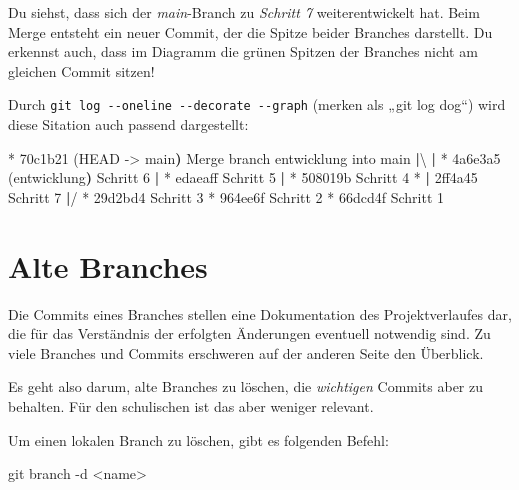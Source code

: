 \documentclass[
  letterpaper,
  DIV=11]{scrreprt}
\newenvironment{Shaded}{\begin{snugshade}}{\end{snugshade}}
\newcommand{\AttributeTok}[1]{\textcolor[rgb]{0.40,0.45,0.13}{#1}}
\newcommand{\ErrorTok}[1]{\textcolor[rgb]{0.68,0.00,0.00}{#1}}
\newcommand{\ExtensionTok}[1]{\textcolor[rgb]{0.00,0.23,0.31}{#1}}
\newcommand{\FunctionTok}[1]{\textcolor[rgb]{0.28,0.35,0.67}{#1}}
\newcommand{\KeywordTok}[1]{\textcolor[rgb]{0.00,0.23,0.31}{\textbf{#1}}}
\newcommand{\NormalTok}[1]{\textcolor[rgb]{0.00,0.23,0.31}{#1}}
\newcommand{\OperatorTok}[1]{\textcolor[rgb]{0.37,0.37,0.37}{#1}}
\newcommand{\StringTok}[1]{\textcolor[rgb]{0.13,0.47,0.30}{#1}}
\begin{document}
Du siehst, dass sich der \emph{main}-Branch zu \emph{Schritt 7}
weiterentwickelt hat. Beim Merge entsteht ein neuer Commit, der die
Spitze beider Branches darstellt. Du erkennst auch, dass im Diagramm die
grünen Spitzen der Branches nicht am gleichen Commit sitzen!

Durch \texttt{git\ log\ -\/-oneline\ -\/-decorate\ -\/-graph} (merken
als „git log dog``) wird diese Sitation auch passend dargestellt:

\begin{Shaded}
\begin{Highlighting}[]
\ExtensionTok{*}\NormalTok{   70c1b21 }\ErrorTok{(}\ExtensionTok{HEAD} \AttributeTok{{-}}\OperatorTok{\textgreater{}}\NormalTok{ main}\KeywordTok{)} \ExtensionTok{Merge}\NormalTok{ branch }\StringTok{\textquotesingle{}entwicklung\textquotesingle{}}\NormalTok{ into main}
\KeywordTok{|}\ExtensionTok{\textbackslash{} } 
\KeywordTok{|} \ExtensionTok{*}\NormalTok{ 4a6e3a5 }\ErrorTok{(}\ExtensionTok{entwicklung}\KeywordTok{)} \ExtensionTok{Schritt}\NormalTok{ 6}
\KeywordTok{|} \ExtensionTok{*}\NormalTok{ edaeaff Schritt 5}
\KeywordTok{|} \ExtensionTok{*}\NormalTok{ 508019b Schritt 4}
\ExtensionTok{*} \KeywordTok{|} \ExtensionTok{2ff4a45}\NormalTok{ Schritt 7}
\KeywordTok{|}\ExtensionTok{/}  
\ExtensionTok{*}\NormalTok{ 29d2bd4 Schritt 3}
\ExtensionTok{*}\NormalTok{ 964ee6f Schritt 2}
\ExtensionTok{*}\NormalTok{ 66dcd4f Schritt 1}
\end{Highlighting}
\end{Shaded}

\section{Alte Branches}\label{alte-branches}

Die Commits eines Branches stellen eine Dokumentation des
Projektverlaufes dar, die für das Verständnis der erfolgten Änderungen
eventuell notwendig sind. Zu viele Branches und Commits erschweren auf
der anderen Seite den Überblick.

Es geht also darum, alte Branches zu löschen, die \emph{wichtigen}
Commits aber zu behalten. Für den schulischen ist das aber weniger
relevant.

Um einen lokalen Branch zu löschen, gibt es folgenden Befehl:

\begin{Shaded}
\begin{Highlighting}[]
\FunctionTok{git}\NormalTok{ branch }\AttributeTok{{-}d} \OperatorTok{\textless{}}\NormalTok{name}\OperatorTok{\textgreater{}}
\end{Highlighting}
\end{Shaded}
\end{document}
